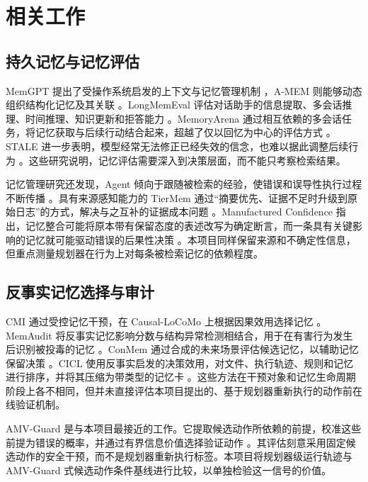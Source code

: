 \documentclass[11pt]{article}
\begin{document}
\section{相关工作}

\subsection{持久记忆与记忆评估}

MemGPT 提出了受操作系统启发的上下文与记忆管理机制 \cite{packer2023memgpt}，A-MEM 则能够动态组织结构化记忆及其关联 \cite{xu2025amem}。LongMemEval 评估对话助手的信息提取、多会话推理、时间推理、知识更新和拒答能力 \cite{wu2025longmemeval}。MemoryArena 通过相互依赖的多会话任务，将记忆获取与后续行动结合起来，超越了仅以回忆为中心的评估方式 \cite{he2026memoryarena}。STALE 进一步表明，模型经常无法修正已经失效的信念，也难以据此调整后续行为 \cite{chao2026stale}。这些研究说明，记忆评估需要深入到决策层面，而不能只考察检索结果。

记忆管理研究还发现，Agent 倾向于跟随被检索的经验，使错误和误导性执行过程不断传播 \cite{xiong2026memory}。具有来源感知能力的 TierMem 通过“摘要优先、证据不足时升级到原始日志”的方式，解决与之互补的证据成本问题 \cite{zhu2026tiermem}。Manufactured Confidence 指出，记忆整合可能将原本带有保留态度的表述改写为确定断言，而一条具有关键影响的记忆就可能驱动错误的后果性决策 \cite{kwon2026confidence}。本项目同样保留来源和不确定性信息，但重点测量规划器在行为上对每条被检索记忆的依赖程度。

\subsection{反事实记忆选择与审计}

CMI 通过受控记忆干预，在 Causal-LoCoMo 上根据因果效用选择记忆 \cite{srivastava2026cmi}。MemAudit 将反事实记忆影响分数与结构异常检测相结合，用于在有害行为发生后识别被投毒的记忆 \cite{tan2026memaudit}。ConMem 通过合成的未来场景评估候选记忆，以辅助记忆保留决策 \cite{zhang2026conmem}。CICL 使用反事实启发的决策效用，对文件、执行轨迹、规则和记忆进行排序，并将其压缩为带类型的记忆卡 \cite{guan2026cicl}。这些方法在干预对象和记忆生命周期阶段上各不相同，但并未直接评估本项目提出的、基于规划器重新执行的动作前在线验证机制。

AMV-Guard 是与本项目最接近的工作。它提取候选动作所依赖的前提，校准这些前提为错误的概率，并通过有界信息价值选择验证动作 \cite{wang2026amv}。其评估刻意采用固定候选动作的安全干预，而不是规划器重新执行标签。本项目将规划器级运行轨迹与 AMV-Guard 式候选动作条件基线进行比较，以单独检验这一信号的价值。
\end{document}
